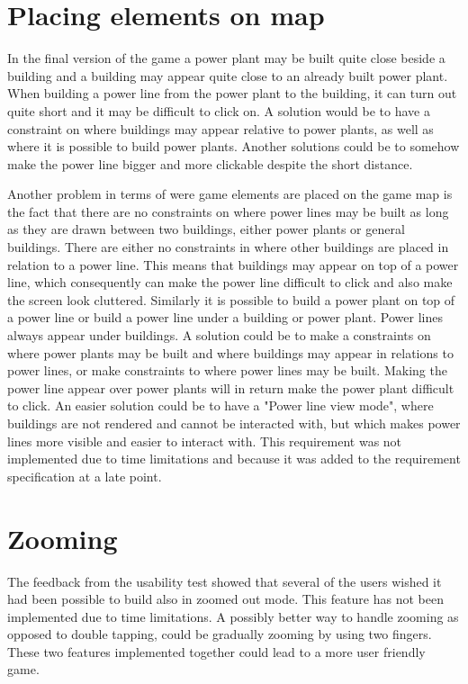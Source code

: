 \section*{Placing elements on map}

In the final version of the game a power plant may be built quite close beside a building 
and a building may appear quite close to an already built power plant. When building a power 
line from the power plant to the building, it can turn out quite short and it may be difficult 
to click on. A solution would be to have a constraint on where buildings may appear relative 
to power plants, as well as where it is possible to build power plants. Another solutions 
could be to somehow make the power line bigger and more clickable despite the short distance. 

Another problem in terms of were game elements are placed on the game map is the fact that 
there are no constraints on where power lines may be built as long as they are drawn between 
two buildings, either power plants or general buildings. There are either no constraints in 
where other buildings are placed in relation to a power line. This means that buildings may 
appear on top of a power line, which consequently can make the power line difficult to click 
and also make the screen look cluttered. Similarly it is possible to build a power plant on 
top of a power line or build a power line under a building or power plant. Power lines always 
appear under buildings. A solution could be to make a constraints on where power plants 
may be built and where buildings may appear in relations to power lines, or make constraints 
to where power lines may be built. Making the power line appear over power plants will in return 
make the power plant difficult to click. An easier solution could be to have a 
"Power line view mode", where buildings are not rendered and cannot be interacted with, but which 
makes power lines more visible and easier to interact with. This requirement was not implemented 
due to time limitations and because it was added to the requirement specification at a late point.

\section*{Zooming}

The feedback from the usability test showed that several of the users wished it had been 
possible to build also in zoomed out mode. This feature has not been implemented due to 
time limitations. A possibly better way to handle zooming as opposed to double tapping, 
could be gradually zooming by using two fingers. These two features implemented together 
could lead to a more user friendly game.

